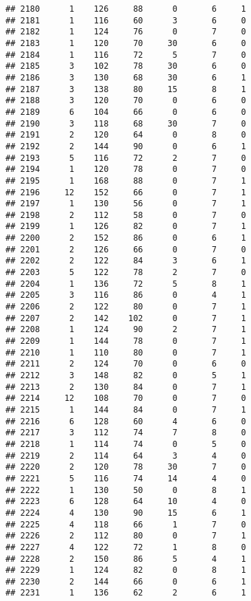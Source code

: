 \documentclass[
]{article}
\begin{document}
\begin{verbatim}
## 2180      1    126     88      0       6     1
## 2181      1    116     60      3       6     0
## 2182      1    124     76      0       7     0
## 2183      1    120     70     30       6     0
## 2184      1    116     72      5       7     0
## 2185      3    102     78     30       6     0
## 2186      3    130     68     30       6     1
## 2187      3    138     80     15       8     1
## 2188      3    120     70      0       6     0
## 2189      6    104     66      0       6     0
## 2190      3    118     68     30       7     0
## 2191      2    120     64      0       8     0
## 2192      2    144     90      0       6     1
## 2193      5    116     72      2       7     0
## 2194      1    120     78      0       7     0
## 2195      1    168     88      0       7     1
## 2196     12    152     66      0       7     1
## 2197      1    130     56      0       7     1
## 2198      2    112     58      0       7     0
## 2199      1    126     82      0       7     1
## 2200      2    152     86      0       6     1
## 2201      2    126     66      0       7     0
## 2202      2    122     84      3       6     1
## 2203      5    122     78      2       7     0
## 2204      1    136     72      5       8     1
## 2205      3    116     86      0       4     1
## 2206      2    122     80      0       7     1
## 2207      2    142    102      0       7     1
## 2208      1    124     90      2       7     1
## 2209      1    144     78      0       7     1
## 2210      1    110     80      0       7     1
## 2211      2    124     70      0       6     0
## 2212      3    148     82      0       5     1
## 2213      2    130     84      0       7     1
## 2214     12    108     70      0       7     0
## 2215      1    144     84      0       7     1
## 2216      6    128     60      4       6     0
## 2217      3    112     74      7       8     0
## 2218      1    114     74      0       5     0
## 2219      2    114     64      3       4     0
## 2220      2    120     78     30       7     0
## 2221      5    116     74     14       4     0
## 2222      1    130     50      0       8     1
## 2223      6    128     64     10       4     0
## 2224      4    130     90     15       6     1
## 2225      4    118     66      1       7     0
## 2226      2    112     80      0       7     1
## 2227      4    122     72      1       8     0
## 2228      2    150     86      5       4     1
## 2229      1    124     82      0       8     1
## 2230      2    144     66      0       6     1
## 2231      1    136     62      2       6     1

\end{verbatim}
\end{document}
